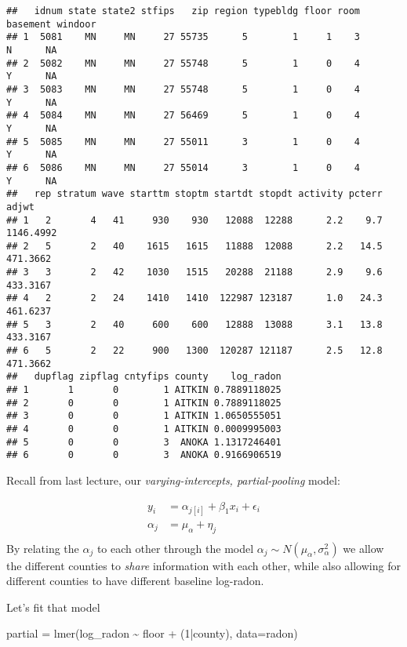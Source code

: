 \documentclass[
]{article}
\newenvironment{Shaded}{\begin{snugshade}}{\end{snugshade}}
\newcommand{\AttributeTok}[1]{\textcolor[rgb]{0.77,0.63,0.00}{#1}}
\newcommand{\DecValTok}[1]{\textcolor[rgb]{0.00,0.00,0.81}{#1}}
\newcommand{\FunctionTok}[1]{\textcolor[rgb]{0.00,0.00,0.00}{#1}}
\newcommand{\NormalTok}[1]{#1}
\newcommand{\OtherTok}[1]{\textcolor[rgb]{0.56,0.35,0.01}{#1}}
\newcommand{\SpecialCharTok}[1]{\textcolor[rgb]{0.00,0.00,0.00}{#1}}
\begin{document}
\begin{verbatim}
##   idnum state state2 stfips   zip region typebldg floor room basement windoor
## 1  5081    MN     MN     27 55735      5        1     1    3        N      NA
## 2  5082    MN     MN     27 55748      5        1     0    4        Y      NA
## 3  5083    MN     MN     27 55748      5        1     0    4        Y      NA
## 4  5084    MN     MN     27 56469      5        1     0    4        Y      NA
## 5  5085    MN     MN     27 55011      3        1     0    4        Y      NA
## 6  5086    MN     MN     27 55014      3        1     0    4        Y      NA
##   rep stratum wave starttm stoptm startdt stopdt activity pcterr     adjwt
## 1   2       4   41     930    930   12088  12288      2.2    9.7 1146.4992
## 2   5       2   40    1615   1615   11888  12088      2.2   14.5  471.3662
## 3   3       2   42    1030   1515   20288  21188      2.9    9.6  433.3167
## 4   2       2   24    1410   1410  122987 123187      1.0   24.3  461.6237
## 5   3       2   40     600    600   12888  13088      3.1   13.8  433.3167
## 6   5       2   22     900   1300  120287 121187      2.5   12.8  471.3662
##   dupflag zipflag cntyfips county    log_radon
## 1       1       0        1 AITKIN 0.7889118025
## 2       0       0        1 AITKIN 0.7889118025
## 3       0       0        1 AITKIN 1.0650555051
## 4       0       0        1 AITKIN 0.0009995003
## 5       0       0        3  ANOKA 1.1317246401
## 6       0       0        3  ANOKA 0.9166906519
\end{verbatim}

Recall from last lecture, our \emph{varying-intercepts, partial-pooling}
model:

\[
\begin{split}
y_i &= \alpha_{j[i]} + \beta_1 x_i + \epsilon_i\\
\alpha_j& = \mu_{\alpha} + \eta_j\\
\end{split}
\] By relating the \(\alpha_j\) to each other through the model
\(\alpha_j \sim N(\mu_{\alpha},\sigma^2_{\alpha})\) we allow the
different counties to \emph{share} information with each other, while
also allowing for different counties to have different baseline
log-radon.

Let's fit that model

\begin{Shaded}
\begin{Highlighting}[]
\NormalTok{partial }\OtherTok{=} \FunctionTok{lmer}\NormalTok{(log\_radon }\SpecialCharTok{\textasciitilde{}}\NormalTok{ floor }\SpecialCharTok{+}\NormalTok{ (}\DecValTok{1}\SpecialCharTok{|}\NormalTok{county), }\AttributeTok{data=}\NormalTok{radon)}
\end{Highlighting}
\end{Shaded}
\end{document}
